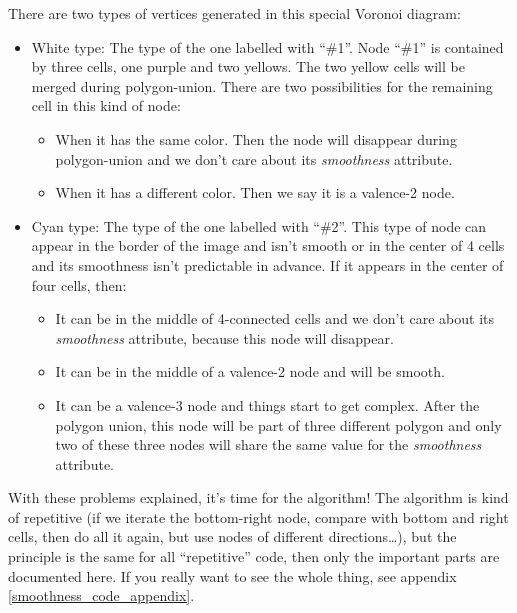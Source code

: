 There are two types of vertices generated in this special Voronoi diagram:

\begin{itemize}
\item White type: The type of the one labelled with ``\#1''. Node ``\#1'' is
  contained by three cells, one purple and two yellows. The two yellow cells
  will be merged during polygon-union. There are two possibilities for the
  remaining cell in this kind of node:
  \begin{itemize}
  \item When it has the same color. Then the node will disappear during
    polygon-union and we don't care about its \emph{smoothness} attribute.
  \item When it has a different color. Then we say it is a valence-2 node.
  \end{itemize}
\item Cyan type: The type of the one labelled with ``\#2''. This type of node can
  appear in the border of the image and isn't smooth or in the center of 4 cells
  and its smoothness isn't predictable in advance. If it appears in the center
  of four cells, then:
  \begin{itemize}
  \item It can be in the middle of 4-connected cells and we don't care about its
    \emph{smoothness} attribute, because this node will disappear.
  \item It can be in the middle of a valence-2 node and will be smooth.
  \item It can be a valence-3 node and things start to get complex. After the
    polygon union, this node will be part of three different polygon and only
    two of these three nodes will share the same value for the \emph{smoothness}
    attribute.
  \end{itemize}
\end{itemize}

With these problems explained, it's time for the algorithm! The algorithm is
kind of repetitive (if we iterate the bottom-right node, compare with bottom and
right cells, then do all it again, but use nodes of different
directions\ldots{}), but the principle is the same for all ``repetitive'' code,
then only the important parts are documented here. If you really want to see the
whole thing, see appendix \ref{smoothness_code_appendix}.

